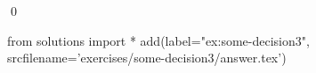 
\begin{ex} 
  \label{ex:some-decision3}
  
  \qed
\end{ex} 
\begin{python0}
from solutions import *
add(label="ex:some-decision3",
    srcfilename='exercises/some-decision3/answer.tex') 
\end{python0}
